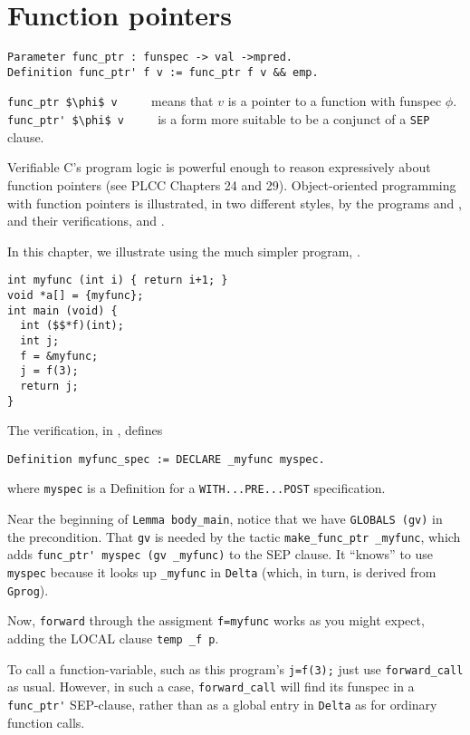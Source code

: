 \documentclass[12pt,fleqn,openany,oneside,showtrims]{memoir}
\begin{document}
\chapter{Function pointers}
\label{refcard:funcptr}
\begin{lstlisting}
Parameter func_ptr : funspec -> val ->mpred.
Definition func_ptr' f v := func_ptr f v && emp.
\end{lstlisting}
\lstinline{func_ptr $\phi$ v} $\qquad$ means that $v$
is a pointer to a function with funspec $\phi$.\newline
\lstinline{func_ptr' $\phi$ v} $\qquad$ is a form more suitable to
be a conjunct of a \lstinline{SEP} clause.

Verifiable C's program logic is powerful enough to reason expressively
about function pointers (see PLCC Chapters 24 and 29).  Object-oriented
programming with function pointers is illustrated, in two different
styles, by the programs  and ,
and their verifications,
 and .

In this chapter, we illustrate using the much simpler program,
.
\begin{lstlisting}
int myfunc (int i) { return i+1; }
void *a[] = {myfunc};
int main (void) {
  int ($$*f)(int);
  int j;
  f = &myfunc;
  j = f(3);
  return j;
}
\end{lstlisting}
The verification, in , defines
\begin{lstlisting}
Definition myfunc_spec := DECLARE _myfunc myspec.
\end{lstlisting}
where \lstinline{myspec} is
a Definition for a \lstinline{WITH...PRE...POST} specification.

Near the beginning of \lstinline{Lemma body_main},
notice that we have \linebreak
\lstinline{GLOBALS (gv)} in the precondition.
That \lstinline{gv} is needed by
the tactic \lstinline{make_func_ptr _myfunc},
which adds \lstinline{func_ptr' myspec (gv _myfunc)} to the SEP clause.
It ``knows'' to use \lstinline{myspec} because it looks
up \lstinline{_myfunc} in
\lstinline{Delta} (which, in turn, is derived from \lstinline{Gprog}).

Now, \lstinline{forward} through the assigment \lstinline{f=myfunc}
works as you might expect, adding the LOCAL clause
\lstinline{temp _f p}.

To call a function-variable, such as this program's \lstinline{j=f(3);}
just use \lstinline{forward_call} as usual.  However, in such a case,
\lstinline{forward_call} will find its funspec in a
\lstinline{func_ptr'} SEP-clause, rather than as a global entry
in \lstinline{Delta} as for ordinary function calls.
\end{document}
